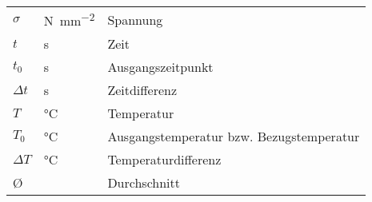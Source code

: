 \begin{spacing}{1.5}
\begin{longtable}{@{\extracolsep{\fill}}lll}
    \(\sigma\)                &\si{\N\per\mm\squared}                                           &Spannung                                                                                                           \\
    \(t\)                &\si{\s}                                           &Zeit                                                        \\
    \(t_0\)                &\si{\s}                                           &Ausgangszeitpunkt                                                        \\
    \(\Delta t\)                &\si{\s}                                           &Zeitdifferenz                                                        \\
    \(T\)                &\si{\degreeCelsius}                                           &Temperatur                                                        \\
    \(T_0\)                &\si{\degreeCelsius}                                           &Ausgangstemperatur bzw. Bezugstemperatur                                                        \\
    \(\Delta T\)                &\si{\degreeCelsius}                                         &Temperaturdifferenz                                                        \\
    \O                &                                           &Durchschnitt                                                        \\
\end{longtable}
\end{spacing}

                    